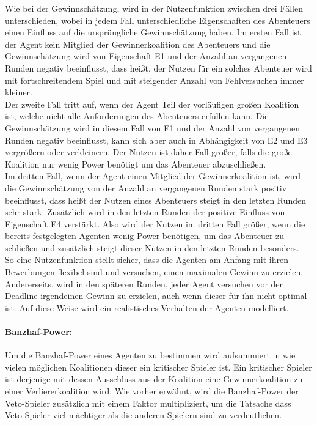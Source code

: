 \documentclass[fleqn,10pt]{SelfArx} %
\begin{document}
Wie bei der Gewinnschätzung, wird in der Nutzenfunktion zwischen drei Fällen unterschieden, wobei in jedem Fall unterschiedliche Eigenschaften des Abenteuers einen Einfluss auf die ursprüngliche Gewinnschätzung haben. Im ersten Fall ist der Agent kein Mitglied der Gewinnerkoalition des Abenteuers und die Gewinnschätzung wird von Eigenschaft E1 und der Anzahl an vergangenen Runden negativ beeinflusst, dass heißt, der Nutzen für ein solches Abenteuer wird mit fortschreitendem Spiel und mit steigender Anzahl von Fehlversuchen immer kleiner. \\
Der zweite Fall tritt auf, wenn der Agent Teil der vorläufigen großen Koalition ist, welche nicht alle Anforderungen des Abenteuers erfüllen kann. Die Gewinnschätzung wird in diesem Fall von E1 und der Anzahl von vergangenen Runden negativ beeinflusst, kann sich aber auch in Abhängigkeit von E2 und E3 vergrößern oder verkleinern. Der Nutzen ist daher Fall größer, falls die große Koalition nur wenig Power benötigt um das Abenteuer abzuschließen. \\
Im dritten Fall, wenn der Agent einen Mitglied der Gewinnerkoalition ist, wird die Gewinnschätzung von der Anzahl an vergangenen Runden stark positiv beeinflusst, dass heißt der Nutzen eines Abenteuers steigt in den letzten Runden sehr stark. Zusätzlich wird in den letzten Runden der positive Einfluss von Eigenschaft E4 verstärkt. Also wird der Nutzen im dritten Fall größer, wenn die bereits festgelegten Agenten wenig Power benötigen, um das Abenteuer zu schließen und zusätzlich steigt dieser Nutzen in den letzten Runden besonders.\\
So eine Nutzenfunktion stellt sicher, dass die Agenten am Anfang mit ihren Bewerbungen flexibel sind und versuchen, einen maximalen Gewinn zu erzielen. Andererseits, wird in den späteren Runden, jeder Agent versuchen vor der Deadline irgendeinen Gewinn zu erzielen, auch wenn dieser für ihn nicht optimal ist. Auf diese Weise wird ein realistisches Verhalten der Agenten modelliert. 


\paragraph{Banzhaf-Power:}
Um die Banzhaf-Power eines Agenten zu bestimmen wird aufsummiert in wie vielen möglichen Koalitionen dieser ein kritischer Spieler ist. Ein kritischer Spieler ist derjenige mit dessen Ausschluss aus der Koalition eine Gewinnerkoalition zu einer Verliererkoalition wird. Wie vorher erwähnt, wird die Banzhaf-Power der Veto-Spieler zusätzlich mit einem Faktor multipliziert, um die Tatsache dass Veto-Spieler viel mächtiger als die anderen Spielern sind zu verdeutlichen.
\end{document}
